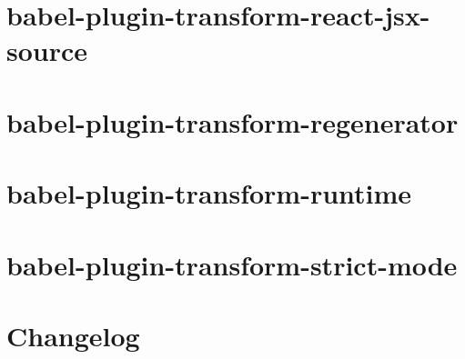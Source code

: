 \documentclass[twoside]{book}
\newcommand{\+}{\discretionary{\mbox{\scriptsize$\hookleftarrow$}}{}{}}
\begin{document}
\chapter{babel-\/plugin-\/transform-\/react-\/jsx-\/source}
\label{md__c_1_workspace_demo_src_main_script_node_modules_babel-plugin-transform-react-jsx-source__r_e_a_d_m_e}

\chapter{babel-\/plugin-\/transform-\/regenerator}
\label{md__c_1_workspace_demo_src_main_script_node_modules_babel-plugin-transform-regenerator__r_e_a_d_m_e}

\chapter{babel-\/plugin-\/transform-\/runtime}
\label{md__c_1_workspace_demo_src_main_script_node_modules_babel-plugin-transform-runtime__r_e_a_d_m_e}

\chapter{babel-\/plugin-\/transform-\/strict-\/mode}
\label{md__c_1_workspace_demo_src_main_script_node_modules_babel-plugin-transform-strict-mode__r_e_a_d_m_e}

\chapter{Changelog}
\label{md__c_1_workspace_demo_src_main_script_node_modules_babel-preset-env__c_h_a_n_g_e_l_o_g}

\end{document}
